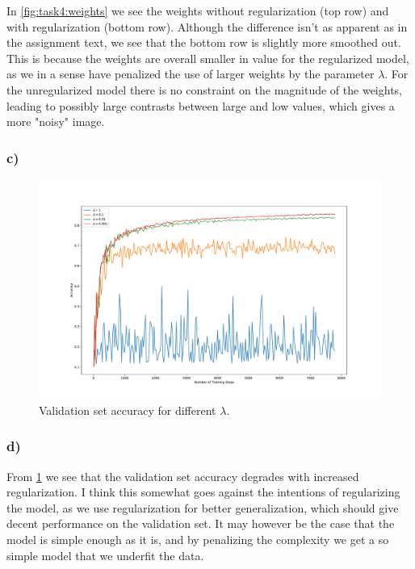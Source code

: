 In \cref{fig:task4:weights} we see the weights without regularization (top row) and with regularization (bottom row). Although the difference isn't as apparent as in the assignment text, we see that the bottom row is slightly more smoothed out. This is because the weights are overall smaller in value for the regularized model, as we in a sense have penalized the use of larger weights by the parameter $\lambda$. For the unregularized model there is no constraint on the magnitude of the weights, leading to possibly large contrasts between large and low values, which gives a more "noisy" image.
\newpage
\subsubsection*{c)}

\begin{figure}[h!]
  \centering
  \includegraphics[clip, trim=0cm 0cm 0cm 0cm, width=\textwidth]{figures/Task4c.pdf}
  \caption{Validation set accuracy for different $\lambda$.}
  \label{fig:task4:val_accuracy_lambdas}
\end{figure}


\subsubsection*{d)}

From \cref{fig:task4:val_accuracy_lambdas} we see that the validation set accuracy degrades with increased regularization. I think this somewhat goes against the intentions of regularizing the model, as we use regularization for better generalization, which should give decent performance on the validation set. It may however be the case that the model is simple enough as it is, and by penalizing the complexity we get a so simple model that we underfit the data.



